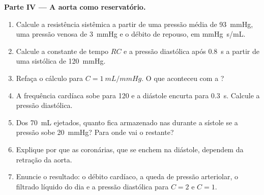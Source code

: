 \begin{problem}
\medskip
\noindent\textbf{Parte IV --- A aorta como reservatório.}
\begin{enumerate}[resume]
  \item Calcule a resistência sistêmica a partir de uma pressão média de
        \qty{93}{mmHg}, uma pressão venosa de \qty{3}{mmHg} e o débito de
        repouso, em \unit{mmHg.s/mL}.
  \item Calcule a constante de tempo $RC$ e a pressão diastólica após
        \qty{0.8}{s} a partir de uma sistólica de \qty{120}{mmHg}.
  \item Refaça o cálculo para $C = \qty{1}{mL/mmHg}$. O que aconteceu
        com a ?
  \item A frequência cardíaca sobe para \num{120} e a diástole encurta
        para \qty{0.3}{s}. Calcule a pressão diastólica.
  \item Dos \qty{70}{mL} ejetados, quanto fica armazenado nas 
        durante a sístole se a pressão sobe \qty{20}{mmHg}? Para onde vai
        o restante?
  \item Explique por que as  coronárias, que se enchem na
        diástole, dependem da retração da aorta.
  \item Enuncie o resultado: o débito cardíaco, a queda de pressão
        arteriolar, o filtrado líquido do dia e a pressão diastólica para
        $C = 2$ e $C = 1$.
\end{enumerate}
\end{problem}
